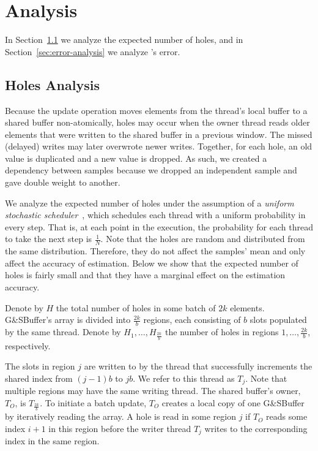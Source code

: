 \chapter{Analysis}
\label{chap:analysis}

In Section~\ref{sec:holes-analysis} we analyze the expected number of holes, and in Section~\ref{sec:error-analysis} we analyze \mysketch's error.

\section{Holes Analysis}
\label{sec:holes-analysis}

Because the update operation moves elements from the thread's local buffer to a shared buffer non-atomically, holes may occur when the owner thread reads older elements that were written to the shared buffer in a previous window. The missed (delayed) writes may later overwrote newer writes. Together, for each hole, an old value is duplicated and a new value is dropped. As such, we created a dependency between samples because we dropped an independent sample and gave double weight to another. 

We analyze the expected number of holes under the assumption of a \emph{uniform stochastic scheduler}~\cite{alistarh2016lock}, which schedules each thread with a uniform probability in every step. That is, at each point in the execution, the probability for each thread to take the next step is $\frac{1}{N}$. Note that the holes are random and distributed from the same distribution. Therefore, they do not affect the samples' mean and only affect the accuracy of estimation. Below we show that the expected number of holes is fairly small and that they have a marginal effect on the estimation accuracy. 

Denote by $H$ the total number of holes in some batch of $2k$ elements. G\&SBuffer's array is divided into $\frac{2k}{b}$ regions, each consisting of $b$ slots populated by the same thread. Denote by $H_1,\dots, H_{\frac{2k}{b}}$ the number of holes in regions $1, \dots, \frac{2k}{b}$, respectively.

The slots in region $j$ are written to by the thread that successfully increments the shared index from $(j-1)b$ to $jb$. We refer to this thread as $T_j$. Note that multiple regions may have the same writing thread. The shared buffer's owner, $T_O$, is $T_{\frac{2k}{b}}$. To initiate a batch update, $T_O$ creates a local copy of one G\&SBuffer by iteratively reading the array. A hole is read in some region $j$ if $T_O$ reads some index $i+1$ in this region before the writer thread $T_j$ writes to the corresponding index in the same region.

